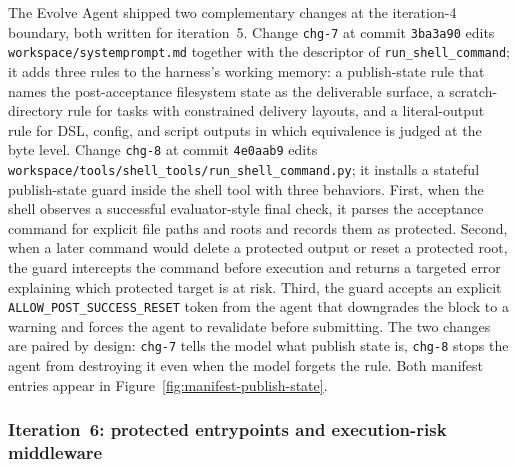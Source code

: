The Evolve Agent shipped two complementary changes at the iteration-4 boundary, both written for iteration~5. Change \texttt{chg-7} at commit \texttt{3ba3a90} edits \texttt{workspace/systemprompt.md} together with the descriptor of \texttt{run\_shell\_command}; it adds three rules to the harness's working memory: a publish-state rule that names the post-acceptance filesystem state as the deliverable surface, a scratch-directory rule for tasks with constrained delivery layouts, and a literal-output rule for DSL, config, and script outputs in which equivalence is judged at the byte level. Change \texttt{chg-8} at commit \texttt{4e0aab9} edits \texttt{workspace/tools/shell\_tools/run\_shell\_command.py}; it installs a stateful publish-state guard inside the shell tool with three behaviors. First, when the shell observes a successful evaluator-style final check, it parses the acceptance command for explicit file paths and roots and records them as protected. Second, when a later command would delete a protected output or reset a protected root, the guard intercepts the command before execution and returns a targeted error explaining which protected target is at risk. Third, the guard accepts an explicit \texttt{ALLOW\_POST\_SUCCESS\_RESET} token from the agent that downgrades the block to a warning and forces the agent to revalidate before submitting. The two changes are paired by design: \texttt{chg-7} tells the model what publish state is, \texttt{chg-8} stops the agent from destroying it even when the model forgets the rule. Both manifest entries appear in Figure~\ref{fig:manifest-publish-state}.


\FloatBarrier

\subsubsection{Iteration~6: protected entrypoints and execution-risk middleware}
\label{app:case-study:changes:iter6}

